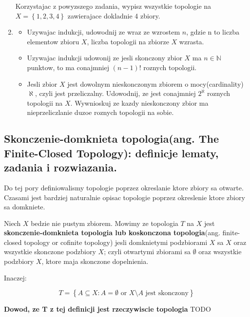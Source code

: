 \documentclass{article}
\begin{document}
\begin{enumerate}
        Korzystajac z powyzszego zadania, wypisz wszystkie topologie na $X = \left\{ 1,2,3,4 \right\}$ zawierajace dokladnie 4 zbiory.

    \item
        \begin{itemize}
            \item Uzywajac indukcji, udowodnij ze wraz ze wzrostem $n$, gdzie n to liczba elementow zbioru $X$, liczba topologii na zbiorze $X$ wzrasta.
            \item Uzywajac indukcji udowonij ze jesli skonczony zbior $X$ ma $n \in \mathbb{N}$ punktow, to ma conajmniej $(n-1)!$ roznych topologii.
            \item Jesli zbior $X$ jest dowolnym nieskonczonym zbiorem o mocy(cardinality) $\aleph$, czyli jest przeliczalny. Udowodnij, ze jest conajmniej $2^{\aleph}$ roznych topologii na $X$. Wywnioskuj ze kazdy nieskonczony zbior ma nieprzeliczlanie duzoe roznych topologii na sobie.
        \end{itemize}
\end{enumerate}%
\subsection{Skonczenie-domknieta topologia(ang. The Finite-Closed Topology): definicje lematy, zadania i rozwiazania.}

Do tej pory definiowalismy topologie poprzez okreslanie ktore zbiory sa otwarte. Czasami jest bardziej naturalnie opisac topologie poprzez okreslenie ktore zbiory sa domkniete. 

\begin{tcolorbox}[colback=white!90!red,colframe=black!35!red,title=1.3.1 Definicja: Skonczenie domknieta topologia(finite-closed topology(cofinite topology))]

    Niech $X$ bedzie nie pustym zbiorem. Mowimy ze topologia $T$ na $X$ jest \textbf{skonczenie-domknieta topologia lub koskonczona topologia}(ang. finite-closed topology or cofinite topology) jesli domknietymi podzbiorami $X$ sa $X$ oraz wszystkie skonczone podzbiory $X$; czyli otwartymi zbiorami sa $\emptyset$ oraz wszystkie podzbiory $X$, ktore maja skonczone dopelnienia.

    Inaczej:

    $$T = \left\{ A \subseteq X: A = \emptyset \text{ or }X \setminus A\text{ jest skonczony} \right\}$$
\end{tcolorbox}

\textbf{Dowod, ze T z tej definicji jest rzeczywiscie topologia} TODO
\end{document}
